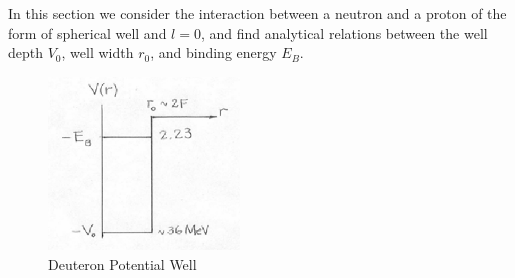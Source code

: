 \documentclass{school-22.101-notes}
\date{October 19, 2011}
\begin{document}
\maketitle


In this section we consider the interaction between a neutron and a proton of the form of spherical well and $l=0$, and find analytical relations between the well depth $V_0$, well width $r_0$, and binding energy $E_B$.  

\begin{figure}[h!]
    \centering
    \includegraphics[width=2in]{images/deuteron/deuteron-potential.png}
    \caption{Deuteron Potential Well}
\end{figure}
\end{document}
